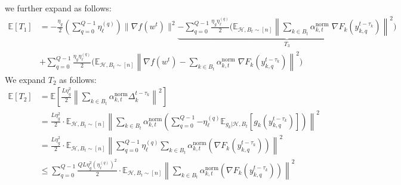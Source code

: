 \documentclass{article}
\begin{document}
we further expand as follows:
\begin{align*}
    \mathbb{E}[T_1] 
    &= -\frac{\eta_g}{2}\left(
        \sum_{q=0}^{Q-1}{\eta_\ell^{(q)}} \right) {\| \nabla f(w^t) \|^2}  
    \underbrace{- \sum_{q=0}^{Q-1}{
            \frac{
                \eta_g \eta_\ell^{(q)}
            }{
                2            
            }\bigg(
                \mathbb{E}_{\mathcal{H}, B_t \sim [n]}
                \left\|
                    \sum_{k \in B_t}{\alpha^{\text{norm}}_{k, t} \; \nabla F_k\left(y_{k, q}^{t - \tau_k}\right)}
                \right\|^2
        } \bigg)}_{T_3}
    \\
    &+
    \sum_{q=0}^{Q-1}{
            \frac{
                \eta_g \eta_\ell^{(q)}
            }{
                2            
            }}\bigg(
    \mathbb{E}_{\mathcal{H}, B_t \sim [n]} 
    \left\|
        \nabla f(w^t) - \sum_{k \in B_t}{
            \alpha^{\text{norm}}_{k, t} \; \nabla F_k(y_{k, q}^{t - \tau_k})
        }
    \right\|^2
    \bigg)
\end{align*}
We expand $T_2$ as follows:
\begin{align*}
    \mathbb{E}[T_2]
    &= \mathbb{E}\left[
    \frac{L \eta^2_g}{2} \left\| \sum_{k \in B_t}{\alpha^{\text{norm}}_{k, t} \Delta_k^{t - \tau_k}}\right\|^2
    \right]
    \\
    &= 
    \frac{L \eta^2_g}{2} \cdot 
    \mathbb{E}_{\mathcal{H}, B_t \sim [n]}
    \left\|
        \sum_{k\in B_t}{
        \alpha_{k, t}^\text{norm} \left(
            \sum_{q=0}^{Q-1}{
                -\eta_\ell^{(q)} \mathbb{E}_{g_k | \mathcal{H}, B_t}[g_k(y_{k, q}^{t - \tau_k})]
            }
        \right)
        }
    \right\|^2
    \\
    &= 
    \frac{L \eta^2_g}{2} \cdot 
    \mathbb{E}_{\mathcal{H}, B_t \sim [n]}
    \left\|
        \sum_{q=0}^{Q-1}{
        \eta_\ell^{(q)} 
        \sum_{k\in B_t}{
        \alpha_{k, t}^\text{norm} \left(
                \nabla F_k(y_{k, q}^{t - \tau_k})
        \right)
        }
        }
    \right\|^2
    \\
    &\leq
    \sum_{q=0}^{Q-1}{\frac{QL \eta^2_g \left(\eta_\ell^{(q)}\right)^2 }{2} \cdot 
    \mathbb{E}_{\mathcal{H}, B_t \sim [n]}
        \left\|
        \sum_{k\in B_t}{
        \alpha_{k, t}^\text{norm} \left(
                \nabla F_k(y_{k, q}^{t - \tau_k})
        \right)
        }
    \right\|^2}
\end{align*}
\end{document}
